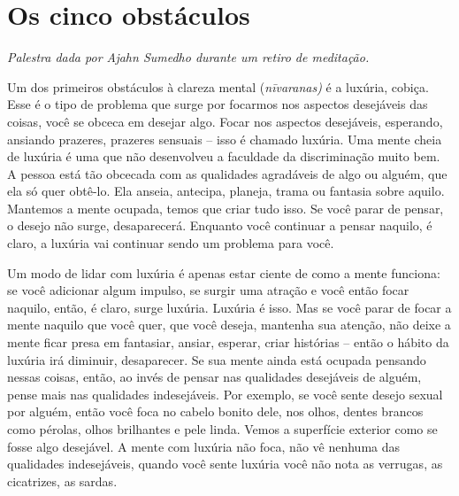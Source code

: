 
\chapter{Os cinco obstáculos}

{\itshape
Palestra dada por Ajahn Sumedho durante um retiro de meditação.}

Um dos primeiros obstáculos à clareza mental (\textit{nīvaranas)
}é a luxúria, cobiça. Esse é o tipo de problema que surge por focarmos
nos aspectos desejáveis das coisas, você se obceca em desejar algo.
Focar nos aspectos desejáveis, esperando, ansiando prazeres, prazeres
sensuais – isso é chamado luxúria. Uma mente cheia de luxúria é uma que
não desenvolveu a faculdade da discriminação muito bem. A pessoa está
tão obcecada com as qualidades agradáveis de algo ou alguém, que ela só
quer obtê-lo. Ela anseia, antecipa, planeja, trama ou fantasia sobre
aquilo. Mantemos a mente ocupada, temos que criar tudo isso. Se você
parar de pensar, o desejo não surge, desaparecerá. Enquanto você
continuar a pensar naquilo, é claro, a luxúria vai continuar sendo um
problema para você. 

Um modo de lidar com luxúria é apenas estar ciente de como a mente
funciona: se você adicionar algum impulso, se surgir uma atração e você
então focar naquilo, então, é claro, surge luxúria. Luxúria é isso. Mas
se você parar de focar a mente naquilo que você quer, que você deseja,
mantenha sua atenção, não deixe a mente ficar presa em fantasiar,
ansiar, esperar, criar histórias – então o hábito da luxúria irá
diminuir, desaparecer. Se sua mente ainda está ocupada pensando nessas
coisas, então, ao invés de pensar nas qualidades desejáveis de alguém,
pense mais nas qualidades indesejáveis. Por exemplo, se você sente
desejo sexual por alguém, então você foca no cabelo bonito dele, nos
olhos, dentes brancos como pérolas, olhos brilhantes e pele linda.
Vemos a superfície exterior como se fosse algo desejável. A mente com
luxúria não foca, não vê nenhuma das qualidades indesejáveis, quando
você sente luxúria você não nota as verrugas, as cicatrizes, as sardas.


